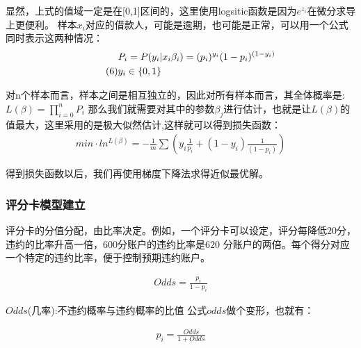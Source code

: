 \documentclass[12pt]{article}
\begin{document}
\begin{flushleft}
	\noindent\qquad 显然，上式的值域一定是在[0,1]区间的，这里使用logsitic函数是因为$e^{z_i}$在微分求导上更便利。
	样本$x_i$对应的借款人，可能是逾期，也可能是正常，可以用一个公式同时表示这两种情况：\\
	
	\begin{align}  %
		 &P_i=P(y_i|x_i\beta_i) = (p_i)^{y_i}(1-p_i)^{(1-y_i)}  \notag\\  \tag{6}
		 &y_i \in \{0,1\} 
	\end{align}
	 
	\noindent\qquad 对n个样本而言，样本之间是相互独立的，因此对所有样本而言，其全体概率是:$L(\beta)=\prod_{i=0}^nP_i$
	\noindent\qquad 那么我们就需要对其中的参数$\beta_j$进行估计，也就是让$L(\beta)$的值最大，这里采用的是极大似然估计,这样就可以得到损失函数：\\
	
	\begin{align}  %
	min·ln^{L(\beta)} =-\frac{1}{m}\sum(y_i\frac{1}{p_i}+(1-y_i)\frac{1}{(1-p_i)})  \tag{7}
	\end{align}
	
	

	\noindent\qquad 得到损失函数以后，我们再使用梯度下降法求得近似最优解。
	
\end{flushleft}

\subsubsection{评分卡模型建立}

\begin{flushleft}
	\noindent\qquad 评分卡的分值分配，由比率决定。例如，一个评分卡可以设定，评分每降低$20$分，违约的比率升高一倍，$600$分账户的违约比率是$620$ 分账户的两倍。每个得分对应一个特定的违约比率，便于控制预期违约账户。
	
\end{flushleft}

\begin{align}  %
Odds=\frac{p_i}{1-p_i} \tag{8}
\end{align}

\begin{flushleft}
	\noindent\qquad $Odds$(几率):不违约概率与违约概率的比值
	公式$odds$做个变形，也就有：
	
\end{flushleft}


\begin{align}  %
p_i=\frac{Odds}{1+Odds}  \tag{9}
\end{align}
\end{document}
